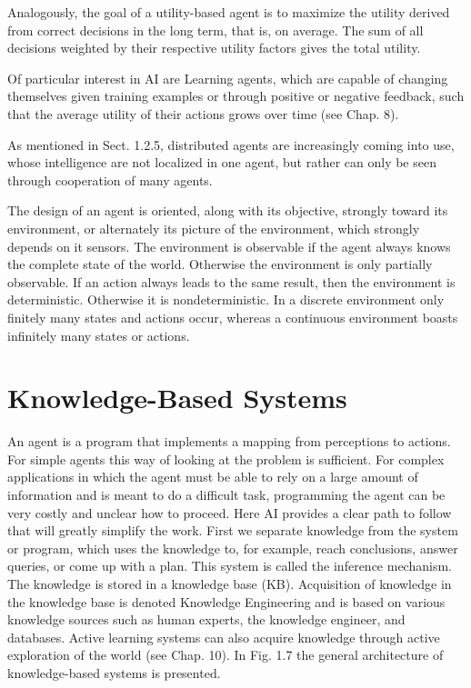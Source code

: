 \documentclass[10pt]{book}
\begin{document}
Analogously, the goal of a utility-based agent is to maximize the utility derived from correct decisions in the long term, that is, on average. The sum of all decisions weighted by their respective utility factors gives the total utility.

Of particular interest in AI are Learning agents, which are capable of changing themselves given training examples or through positive or negative feedback, such that the average utility of their actions grows over time (see Chap. 8).

As mentioned in Sect. 1.2.5, distributed agents are increasingly coming into use, whose intelligence are not localized in one agent, but rather can only be seen through cooperation of many agents.

The design of an agent is oriented, along with its objective, strongly toward its environment, or alternately its picture of the environment, which strongly depends on it sensors. The environment is observable if the agent always knows the complete state of the world. Otherwise the environment is only partially observable. If an action always leads to the same result, then the environment is deterministic. Otherwise it is nondeterministic. In a discrete environment only finitely many states and actions occur, whereas a continuous environment boasts infinitely many states or actions.

\section{Knowledge-Based Systems}
An agent is a program that implements a mapping from perceptions to actions. For simple agents this way of looking at the problem is sufficient. For complex applications in which the agent must be able to rely on a large amount of information and is meant to do a difficult task, programming the agent can be very costly and unclear how to proceed. Here AI provides a clear path to follow that will greatly simplify the work.
First we separate knowledge from the system or program, which uses the knowledge to, for example, reach conclusions, answer queries, or come up with a plan. This system is called the inference mechanism. The knowledge is stored in a knowledge base (KB). Acquisition of knowledge in the knowledge base is denoted Knowledge Engineering and is based on various knowledge sources such as human experts, the knowledge engineer, and databases. Active learning systems can also acquire knowledge through active exploration of the world (see Chap. 10). In Fig. 1.7 the general architecture of knowledge-based systems is presented.
\end{document}
